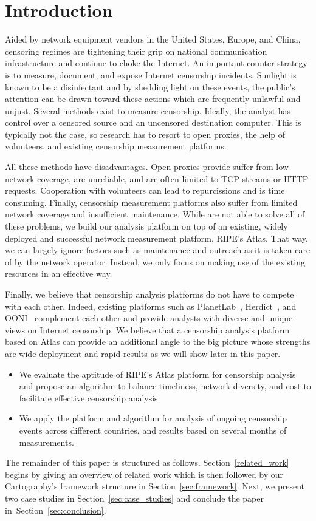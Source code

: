 \section{Introduction}
Aided by network equipment vendors in the United States, Europe, and China,
censoring regimes are tightening their grip on national communication
infrastructure and continue to choke the Internet.  An important counter
strategy is to measure, document, and expose Internet censorship incidents.
Sunlight is known to be a disinfectant and by shedding light on these events,
the public's attention can be drawn toward these actions which are frequently
unlawful and unjust.  Several methods exist to measure censorship.  Ideally,
the analyst has control over a censored source and an uncensored destination
computer.  This is typically not the case, so research has to resort to open
proxies, the help of volunteers, and existing censorship measurement platforms.

All these methods have disadvantages.  Open proxies provide suffer from low
network coverage, are unreliable, and are often limited to TCP streams or HTTP
requests.  Cooperation with volunteers can lead to repurcissions and is time
consuming.  Finally, censorship measurement platforms also suffer from limited
network coverage and insufficient maintenance.  While are not able to solve all
of these problems, we build our analysis platform on top of an existing, widely
deployed and successful network measurement platform, RIPE's Atlas.  That way,
we can largely ignore factors such as maintenance and outreach as it is taken
care of by the network operator.  Instead, we only focus on making use of the
existing resources in an effective way.

Finally, we believe that censorship analysis platforms do not have to compete
with each other.  Indeed, existing platforms such as
PlanetLab~\cite{planetlab}, Herdict~\cite{Herdict}, and OONI~\cite{Filasto2012}
complement each other and provide analysts with diverse and unique views on
Internet censorship.  We believe that a censorship analysis platform based on
Atlas can provide an additional angle to the big picture whose strengths are
wide deployment and rapid results as we will show later in this paper.

\begin{itemize}
	\item We evaluate the aptitude of RIPE's Atlas platform for censorship
		analysis and propose an algorithm to balance timeliness, network
		diversity, and cost to facilitate effective censorship analysis.
	\item We apply the platform and algorithm for analysis of ongoing
		censorship events across different countries, and results based on
		several months of measurements.
\end{itemize}

The remainder of this paper is structured as follows.
Section~\ref{related_work} begins by giving an overview of related work which
is then followed by our \textsf{Cartography}'s framework structure in
Section~\ref{sec:framework}.  Next, we present two case studies in
Section~\ref{sec:case_studies} and conclude the paper
in~Section~\ref{sec:conclusion}.
